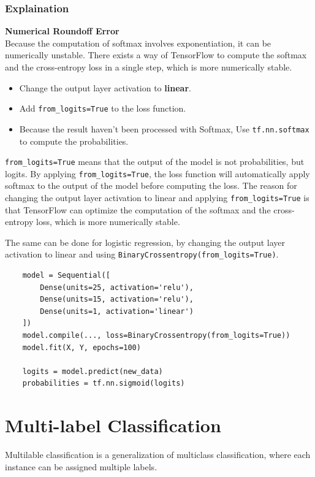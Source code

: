 \subsubsection*{Explaination}
\textbf{Numerical Roundoff Error}\\
    Because the computation of softmax involves exponentiation, it can be numerically unstable.
    There exists a way of TensorFlow to compute the softmax and the cross-entropy loss in a single step, which is more numerically stable.
\begin{notebox}
    \begin{itemize}
        \item Change the output layer activation to \textbf{linear}.
        \item Add \colorbox{mycolor}{\texttt{from\_logits=True}} to the loss function.
        \item Because the result haven't been processed with Softmax, Use \colorbox{mycolor}{\texttt{tf.nn.softmax}} to compute the probabilities.
    \end{itemize}
    \hspace{2em}\colorbox{mycolor}{\texttt{from\_logits=True}} means that the output of the model is not probabilities, but logits.
    By applying \colorbox{mycolor}{\texttt{from\_logits=True}}, the loss function will automatically apply softmax to the output of the model before computing the loss.
    The reason for changing the output layer activation to linear and applying \colorbox{mycolor}{\texttt{from\_logits=True}}
    is that TensorFlow can optimize the computation of the softmax 
    and the cross-entropy loss, which is more numerically stable.
\end{notebox}
\par
The same can be done for logistic regression, by changing the output layer activation to linear and using \texttt{BinaryCrossentropy(from\_logits=True)}.
\begin{verbatim}
    model = Sequential([
        Dense(units=25, activation='relu'),
        Dense(units=15, activation='relu'),
        Dense(units=1, activation='linear')
    ])
    model.compile(..., loss=BinaryCrossentropy(from_logits=True))
    model.fit(X, Y, epochs=100)

    logits = model.predict(new_data)
    probabilities = tf.nn.sigmoid(logits)
\end{verbatim}


\section{Multi-label Classification}
Multilable classification is a generalization of multiclass classification, where each instance can be assigned multiple labels.
